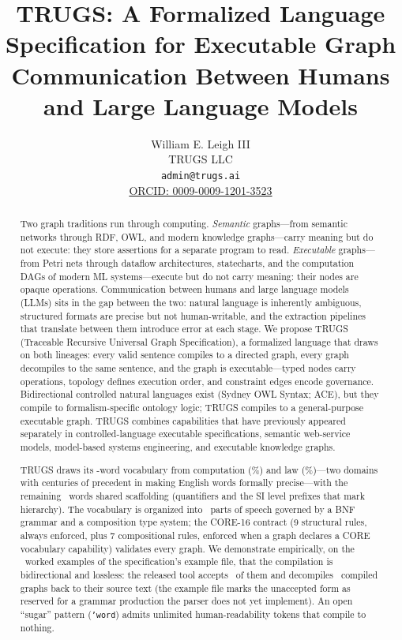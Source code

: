 \documentclass{article}
\title{TRUGS: A Formalized Language Specification for Executable Graph Communication Between Humans and Large Language Models}
\author{
  William E. Leigh III \\
  TRUGS LLC \\
  \texttt{admin@trugs.ai} \\
  \href{https://orcid.org/0009-0009-1201-3523}{ORCID: 0009-0009-1201-3523}
}
\begin{document}
\maketitle

\begin{abstract}
Two graph traditions run through computing. \emph{Semantic} graphs---from semantic networks through RDF, OWL, and modern knowledge graphs---carry meaning but do not execute: they store assertions for a separate program to read. \emph{Executable} graphs---from Petri nets through dataflow architectures, statecharts, and the computation DAGs of modern ML systems---execute but do not carry meaning: their nodes are opaque operations. Communication between humans and large language models (LLMs) sits in the gap between the two: natural language is inherently ambiguous, structured formats are precise but not human-writable, and the extraction pipelines that translate between them introduce error at each stage. We propose TRUGS (Traceable Recursive Universal Graph Specification), a formalized language that draws on both lineages: every valid sentence compiles to a directed graph, every graph decompiles to the same sentence, and the graph is executable---typed nodes carry operations, topology defines execution order, and constraint edges encode governance. Bidirectional controlled natural languages exist (Sydney OWL Syntax; ACE), but they compile to formalism-specific ontology logic; TRUGS compiles to a general-purpose executable graph. TRUGS combines capabilities that have previously appeared separately in controlled-language executable specifications, semantic web-service models, model-based systems engineering, and executable knowledge graphs.

TRUGS draws its \VocabTotal-word vocabulary from computation (\VocabComputationPct\%) and law (\VocabLawPct\%)---two domains with centuries of precedent in making English words formally precise---with the remaining \VocabShared\ words shared scaffolding (quantifiers and the SI level prefixes that mark hierarchy). The vocabulary is organized into \VocabParts\ parts of speech governed by a BNF grammar and a composition type system; the CORE-16 contract (9 structural rules, always enforced, plus 7 compositional rules, enforced when a graph declares a CORE vocabulary capability) validates every graph. We demonstrate empirically, on the \ExamplesTotal\ worked examples of the specification's example file, that the compilation is bidirectional and lossless: the released tool accepts \ExamplesAccepted\ of them and decompiles \ExamplesRoundTrip\ compiled graphs back to their source text (the example file marks the unaccepted form as reserved for a grammar production the parser does not yet implement). An open ``sugar'' pattern (\texttt{'word}) admits unlimited human-readability tokens that compile to nothing.


\end{abstract}
\end{document}
